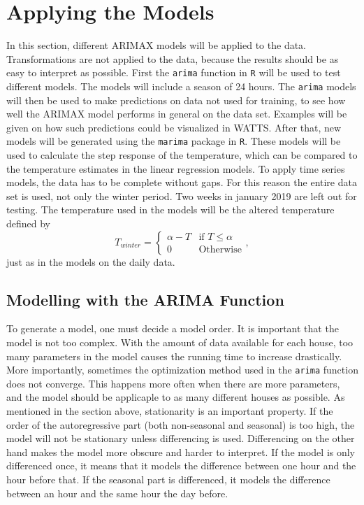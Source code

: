 \section{Applying the Models}
In this section, different ARIMAX models will be applied to the data. Transformations are not applied to the data, because the results should be as easy to interpret as possible. First the \texttt{arima} function in \texttt{R} will be used to test different models. The models will include a season of 24 hours. The \texttt{arima} models will then be used to make predictions on data not used for training, to see how well the ARIMAX model performs in general on the data set. Examples will be given on how such predictions could be visualized in WATTS. After that, new models will be generated using the \texttt{marima} package in \texttt{R}. These models will be used to calculate the step response of the temperature, which can be compared to the temperature estimates in the linear regression models. To apply time series models, the data has to be complete without gaps. For this reason the entire data set is used, not only the winter period. Two weeks in january 2019 are left out for testing. The temperature used in the models will be the altered temperature defined by
\begin{equation}
    T_{winter} = \begin{cases}
        \alpha - T & \text{if } T\leq \alpha\\
        0 & \text{Otherwise}
    \end{cases},
    \label{eq:Ttilde_hour}
\end{equation}
just as in the models on the daily data.

\subsection{Modelling with the ARIMA Function}
To generate a model, one must decide a model order. It is important that the model is not too complex. With the amount of data available for each house, too many parameters in the model causes the running time to increase drastically. More importantly, sometimes the optimization method used in the \texttt{arima} function does not converge. This happens more often when there are more parameters, and the model should be applicaple to as many different houses as possible. As mentioned in the section above, stationarity is an important property. If the order of the autoregressive part (both non-seasonal and seasonal) is too high, the model will not be stationary unless differencing is used. Differencing on the other hand makes the model more obscure and harder to interpret. If the model is only differenced once, it means that it models the difference between one hour and the hour before that. If the seasonal part is differenced, it models the difference between an hour and the same hour the day before.

